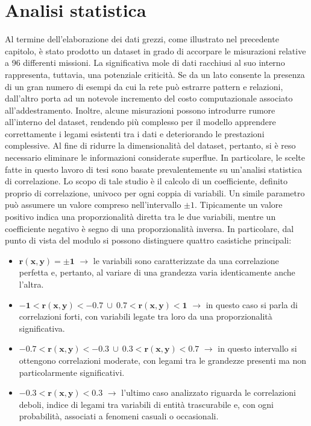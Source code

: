 
\chapter{Analisi statistica}

Al termine dell'elaborazione dei dati grezzi, come illustrato nel precedente capitolo, è stato prodotto un dataset in grado di accorpare le misurazioni relative a 96 differenti missioni. La significativa mole di dati racchiusi al suo interno rappresenta, tuttavia, una potenziale criticità. Se da un lato consente la presenza di un gran numero di esempi da cui la rete può estrarre pattern e relazioni, dall'altro porta ad un notevole incremento del costo computazionale associato all'addestramento. Inoltre, alcune misurazioni possono introdurre rumore all'interno del dataset, rendendo più complesso per il modello apprendere correttamente i legami esistenti tra i dati e deteriorando le prestazioni complessive. Al fine di ridurre la dimensionalità del dataset, pertanto, si è reso necessario eliminare le informazioni considerate superflue. In particolare, le scelte fatte in questo lavoro di tesi sono basate prevalentemente su un'analisi statistica di correlazione. Lo scopo di tale studio è il calcolo di un coefficiente, definito proprio di correlazione, univoco per ogni coppia di variabili. Un simile parametro può assumere un valore compreso nell'intervallo $\pm 1$. Tipicamente un valore positivo indica una proporzionalità diretta tra le due variabili, mentre un coefficiente negativo è segno di una proporzionalità inversa. In particolare, dal punto di vista del modulo si possono distinguere quattro casistiche principali:

\begin{itemize}
    \item $\mathbf{r(x, y) = \pm 1}$ $\rightarrow$ le variabili sono caratterizzate da una correlazione perfetta e, pertanto, al variare di una grandezza varia identicamente anche l'altra.
    
    \item $\mathbf{-1 < r(x, y) < -0.7 \ \cup \ 0.7 < r(x, y) < 1}$ $\rightarrow$ in questo caso si parla di correlazioni forti, con variabili legate tra loro da una proporzionalità significativa.
    
    \item $\mathbf{-0.7 < r(x, y) < -0.3 \ \cup \ 0.3 < r(x, y) < 0.7}$ $\rightarrow$ in questo intervallo si ottengono correlazioni moderate, con legami tra le grandezze presenti ma non particolarmente significativi.
    
    \item $\mathbf{-0.3 < r(x, y) < 0.3}$ $\rightarrow$ l'ultimo caso analizzato riguarda le correlazioni deboli, indice di legami tra variabili di entità trascurabile e, con ogni probabilità, associati a fenomeni casuali o occasionali.
\end{itemize}


